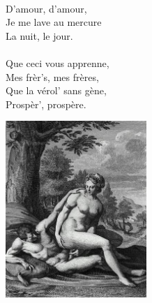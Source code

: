 {\\D'amour, d'amour,
\\Je me lave au mercure
\\La nuit, le jour.
\\\\Que ceci vous apprenne,
\\Mes frèr's, mes frères,
\\Que la vérol' sans gène,
\\Prospèr', prospère.
\\
\begin{center}
\includegraphics[width=0.4\textwidth]{images/margot.jpg}
\end{center}
}

\breakpage
